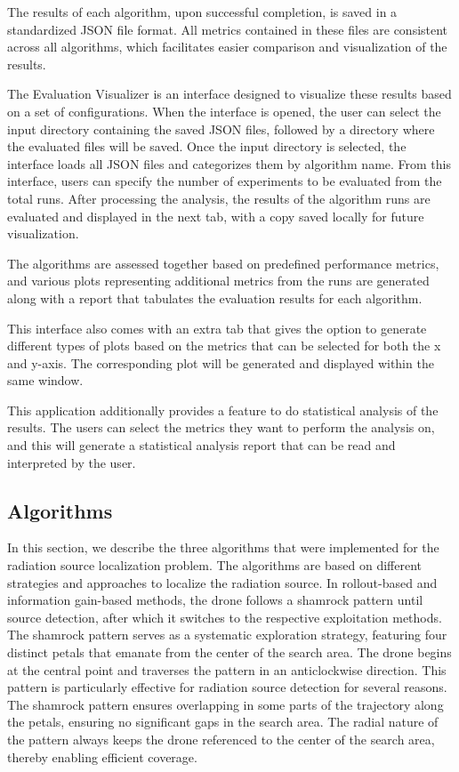 \documentclass[../report.tex]{subfiles}
\begin{document}
    The results of each algorithm, upon successful completion, is saved in a standardized JSON file format. All metrics contained in these files are consistent across all algorithms, which facilitates easier 
    comparison and visualization of the results.

    The Evaluation Visualizer is an interface designed to visualize these results based on a set of configurations. When the interface is opened, the user can select the input directory containing 
    the saved JSON files, followed by a directory where the evaluated files will be saved. Once the input directory is selected, the interface loads all JSON files and categorizes them by algorithm
    name. From this interface, users can specify the number of experiments to be evaluated from the total runs. After processing the analysis, the results of the algorithm runs are evaluated and 
    displayed in the next tab, with a copy saved locally for future visualization.

    The algorithms are assessed together based on predefined performance metrics, and various plots representing additional metrics from the runs are generated along with a report that tabulates 
    the evaluation results for each algorithm. 

    This interface also comes with an extra tab that gives the option to generate different types of plots based on the metrics that can be selected for both the x and y-axis. The corresponding 
    plot will be generated and displayed within the same window.

    This application additionally provides a feature to do statistical analysis of the results. The users can select the metrics they want to perform the analysis on, and this will generate a 
    statistical analysis report that can be read and interpreted by the user.

    \subsection{Algorithms}

    In this section, we describe the three algorithms that were implemented for the radiation source localization problem. The algorithms are based on different strategies and approaches to
    localize the radiation source. In rollout-based and information gain-based methods, the drone follows a shamrock pattern until source detection, after which it switches to the 
    respective exploitation methods. The shamrock pattern serves as a systematic exploration strategy, featuring four distinct petals that emanate from the center of the search area. 
    The drone begins at the central point and traverses the pattern in an anticlockwise direction. This pattern is particularly effective for radiation source detection for several reasons.
    The shamrock pattern ensures overlapping in some parts of the trajectory along the petals, ensuring no significant gaps in the search area. The radial nature of the pattern always 
    keeps the drone referenced to the center of the search area, thereby enabling efficient coverage.
\end{document}
